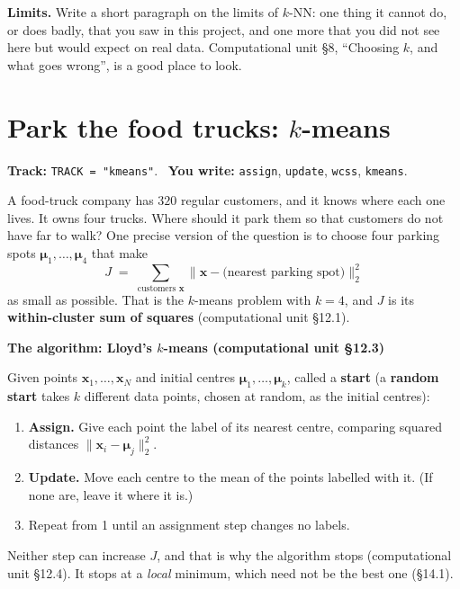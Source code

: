 \documentclass[11pt]{article}
\theoremstyle{definition}
\newenvironment{callout}[1]
  {\par\medskip\needspace{5\baselineskip}%
   \begin{lrbox}{\qcbox}%
   \begin{minipage}{\dimexpr\textwidth-2\fboxsep-4pt}%
   \setlength{\parskip}{0.4em}%
   \textbf{\sffamily\color{RoyalBlue}#1}\par}
  {\end{minipage}\end{lrbox}%
   \begin{center}\colorbox{softbg}{\usebox{\qcbox}}\end{center}\medskip}
\newcommand{\vc}[1]{\mathbf{#1}}
\newcommand{\norm}[1]{\lVert #1\rVert}
\newcommand{\bmu}{\boldsymbol{\mu}}
\begin{document}
\noindent\textbf{Limits.} Write a short paragraph on the limits of $k$-NN: one
thing it cannot do, or does badly, that you saw in this project, and one more
that you did not see here but would expect on real data. Computational unit
\S8, ``Choosing $k$, and what goes wrong'', is a good place to look.

\clearpage
\section{Park the food trucks: $k$-means}
\noindent\textbf{Track:} \texttt{TRACK = "kmeans"}. \ \textbf{You write:}
\texttt{assign}, \texttt{update}, \texttt{wcss}, \texttt{kmeans}.

\medskip
\noindent A food-truck company has $320$ regular customers, and it knows where
each one lives. It owns four trucks. Where should it park them so that
customers do not have far to walk? One precise version of the question is to
choose four parking spots $\bmu_1,\dots,\bmu_4$ that make
\[
  J \;=\; \sum_{\text{customers } \vc{x}}
          \norm{\vc{x}-\text{(nearest parking spot)}}_{2}^{2}
\]
as small as possible. That is the $k$-means problem with $k=4$, and $J$ is its
\textbf{within-cluster sum of squares} (computational unit \S12.1).

\begin{callout}{The algorithm: Lloyd's $k$-means (computational unit \S12.3)}
Given points $\vc{x}_1,\dots,\vc{x}_N$ and initial centres
$\bmu_1,\dots,\bmu_k$, called a \textbf{start} (a \textbf{random
start} takes $k$ different data points, chosen at random, as the initial
centres):
\begin{enumerate}[label=\textbf{\arabic*.},leftmargin=2em,itemsep=2pt,topsep=2pt]
  \item \textbf{Assign.} Give each point the label of its nearest centre,
        comparing squared distances $\norm{\vc{x}_i-\bmu_j}_{2}^{2}$.
  \item \textbf{Update.} Move each centre to the mean of the points labelled
        with it. (If none are, leave it where it is.)
  \item Repeat from 1 until an assignment step changes no labels.
\end{enumerate}
Neither step can increase $J$, and that is why the algorithm stops
(computational unit \S12.4). It stops at a \emph{local} minimum, which need not
be the best one (\S14.1).
\end{callout}
\end{document}
